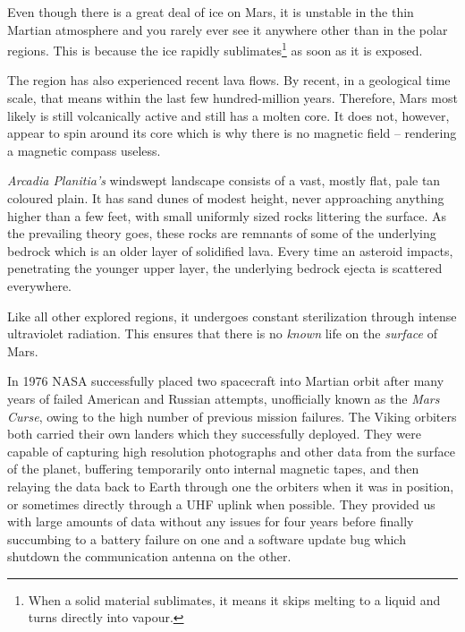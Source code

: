 Even though there is a great deal of ice on Mars, it is unstable in the thin Martian atmosphere and you rarely ever see it anywhere other than in the polar regions. This is because the ice rapidly sublimates\footnote{When a solid material sublimates, it means it skips melting to a liquid and turns directly into vapour.} as soon as it is exposed.

The region has also experienced recent lava flows. By recent, in a geological time scale, that means within the last few hundred-million years. Therefore, Mars most likely is still volcanically active and still has a molten core. It does not, however, appear to spin around its core which is why there is no magnetic field -- rendering a magnetic compass useless.

    {}
    {}
    {}
    \stopcombination

{\it Arcadia Planitia's} windswept landscape consists of a vast, mostly flat, pale tan coloured plain. It has sand dunes of modest height, never approaching anything higher than a few feet, with small uniformly sized rocks littering the surface. As the prevailing theory goes, these rocks are remnants of some of the underlying bedrock which is an older layer of solidified lava. Every time an asteroid impacts, penetrating the younger upper layer, the underlying bedrock ejecta is scattered everywhere.

Like all other explored regions, it undergoes constant sterilization through intense ultraviolet radiation. This ensures that there is no {\it known} life on the {\it surface} of Mars.


In 1976 NASA successfully placed two spacecraft into Martian orbit after many years of failed American and Russian attempts, unofficially known as the {\it Mars Curse}, owing to the high number of previous mission failures. The Viking orbiters both carried their own landers which they successfully deployed. They were capable of capturing high resolution photographs and other data from the surface of the planet, buffering temporarily onto internal magnetic tapes, and then relaying the data back to Earth through one the orbiters when it was in position, or sometimes directly through a UHF uplink when possible. They provided us with large amounts of data without any issues for four years before finally succumbing to a battery failure on one and a software update bug which shutdown the communication antenna on the other.

